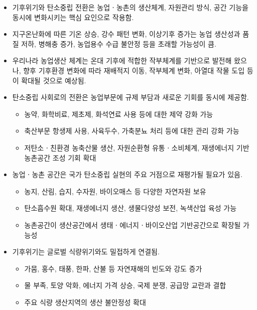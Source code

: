 \begin{itemize}
    \item 기후위기와 탄소중립 전환은 농업ㆍ농촌의 생산체계, 자원관리 방식, 공간 기능을 동시에 변화시키는 핵심 요인으로 작용함.
    
    \item 지구온난화에 따른 기온 상승, 강수 패턴 변화, 이상기후 증가는 농업 생산성과 품질 저하, 병해충 증가, 농업용수 수급 불안정 등을 초래할 가능성이 큼.
    
    \item 우리나라 농업생산 체계는 온대 기후에 적합한 작부체계를 기반으로 발전해 왔으나, 향후 기후환경 변화에 따라 재배적지 이동, 작부체계 변화, 아열대 작물 도입 등이 확대될 것으로 예상됨.
    
    \item 탄소중립 사회로의 전환은 농업부문에 규제 부담과 새로운 기회를 동시에 제공함.
    \begin{itemize}
        \item 농약, 화학비료, 제초제, 화석연료 사용 등에 대한 제약 강화 가능
        \item 축산부문 항생제 사용, 사육두수, 가축분뇨 처리 등에 대한 관리 강화 가능
        \item 저탄소ㆍ친환경 농축산물 생산, 자원순환형 유통ㆍ소비체계, 재생에너지 기반 농촌공간 조성 기회 확대
    \end{itemize}

    \item 농업ㆍ농촌 공간은 국가 탄소중립 실현의 주요 거점으로 재평가될 필요가 있음.
    \begin{itemize}
        \item 농지, 산림, 습지, 수자원, 바이오매스 등 다양한 자연자원 보유
        \item 탄소흡수원 확대, 재생에너지 생산, 생물다양성 보전, 녹색산업 육성 가능
        \item 농촌공간이 생산공간에서 생태ㆍ에너지ㆍ바이오산업 기반공간으로 확장될 가능성
    \end{itemize}

    \item 기후위기는 글로벌 식량위기와도 밀접하게 연결됨.
    \begin{itemize}
        \item 가뭄, 홍수, 태풍, 한파, 산불 등 자연재해의 빈도와 강도 증가
        \item 물 부족, 토양 악화, 에너지 가격 상승, 국제 분쟁, 공급망 교란과 결합
        \item 주요 식량 생산지역의 생산 불안정성 확대
    \end{itemize}


\end{itemize}

